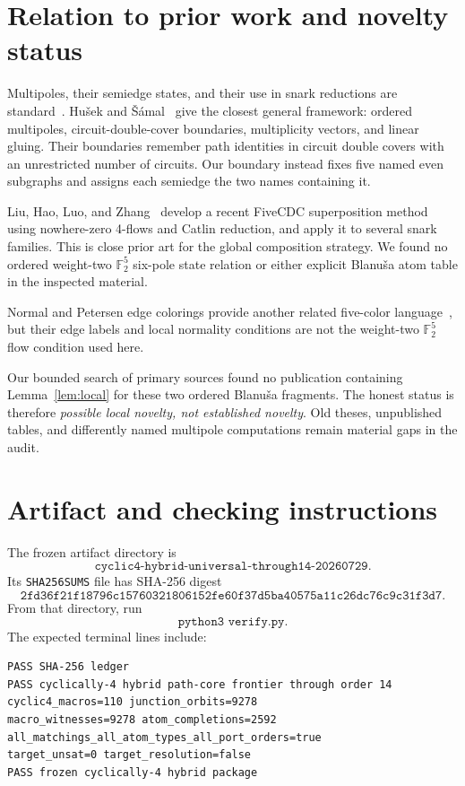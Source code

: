 \documentclass[11pt]{article}
\theoremstyle{definition}
\newcommand{\F}{\mathbb F}
\begin{document}
\section{Relation to prior work and novelty status}

Multipoles, their semiedge states, and their use in snark reductions are
standard~\cite{nedela-skoviera,fiol-vilaltella}.  Hu\v{s}ek and
\v{S}\'amal~\cite{husek-samal-counting} give the closest general framework:
ordered
multipoles, circuit-double-cover boundaries, multiplicity vectors, and linear
gluing.  Their boundaries remember path identities in circuit double covers
with an unrestricted number of circuits.  Our boundary instead fixes five
named even subgraphs and assigns each semiedge the two names containing it.

Liu, Hao, Luo, and Zhang~\cite{liu-hao-luo-zhang} develop a recent
FiveCDC superposition method using nowhere-zero 4-flows and Catlin
reduction, and apply it to several snark families.  This is close prior art
for the global composition strategy.  We found no ordered weight-two
$\F_2^5$ six-pole state relation or either explicit Blanu\v{s}a atom table
in the inspected material.

Normal and Petersen edge colorings provide another related five-color
language~\cite{mazzuoccolo-mkrtchyan,pirot-sereni-skrekovski}, but their edge
labels and local normality conditions are not the weight-two $\F_2^5$ flow
condition used here.

Our bounded search of primary sources found no publication containing
Lemma~\ref{lem:local} for these two ordered Blanu\v{s}a fragments.  The honest
status is therefore \emph{possible local novelty, not established novelty}.
Old theses, unpublished tables, and differently named multipole computations
remain material gaps in the audit.

\section{Artifact and checking instructions}

The frozen artifact directory is
\[
\texttt{cyclic4-hybrid-universal-through14-20260729}.
\]
Its \texttt{SHA256SUMS} file has SHA-256 digest
\[
\texttt{2fd36f21f18796c15760321806152fe60f37d5ba40575a11c26dc76c9c31f3d7}.
\]
From that directory, run
\[
\texttt{python3 verify.py}.
\]
The expected terminal lines include:
\begin{verbatim}
PASS SHA-256 ledger
PASS cyclically-4 hybrid path-core frontier through order 14
cyclic4_macros=110 junction_orbits=9278
macro_witnesses=9278 atom_completions=2592
all_matchings_all_atom_types_all_port_orders=true
target_unsat=0 target_resolution=false
PASS frozen cyclically-4 hybrid package
\end{verbatim}
\end{document}
